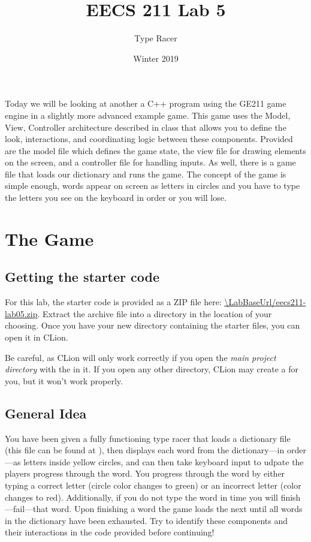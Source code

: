 \documentclass{tufte-handout}
\title{EECS 211 Lab 5}
\author{Type Racer}
\date{Winter 2019}
\def\ThisLabBase{eecs211-lab05}
\def\ThisLabUrl{\LabBaseUrl/\ThisLabBase.zip}
\begin{document}
\maketitle

Today we will be looking at another a C++ program using the GE211 game engine
in a slightly more advanced example game. This game uses the Model, View,
Controller architecture described in class that allows you to define the look,
interactions, and coordinating logic between these components. Provided are
the model file which defines the game state, the view file for drawing elements
on the screen, and a controller file for handling inputs. As well, there is a
game file that loads our dictionary and runs the game. The concept of the game
is simple enough, words appear on screen as letters in circles and you have to
type the letters you see on the keyboard in order or you will lose.

\section{The Game}

\subsection{Getting the starter code}

For this lab, the starter code is provided as a ZIP file here:
\url{\ThisLabUrl}. Extract the archive file into a directory in the
location of your choosing. Once you have your new directory containing
the starter files, you can open it in CLion.

Be careful, as CLion will only work correctly if you open the \emph{main
project directory} with the  in it. If you open
any other directory, CLion may create a  for
you, but it won't work properly.

\subsection{General Idea}

You have been given a fully functioning type racer that loads a dictionary file
(this file can be found at ), then displays
each word from the dictionary---in order---as letters inside yellow circles,
and can then take keyboard input to udpate the players progress through the
word. You progress through the word by either typing a correct letter (circle
color changes to green) or an incorrect letter (color changes to red).
Additionally, if you do not type the word in time you will finish---fail---that
word. Upon finishing a word the game loads the next until all words in the
dictionary have been exhausted. Try to identify these components and their
interactions in the code provided before continuing!
\end{document}
